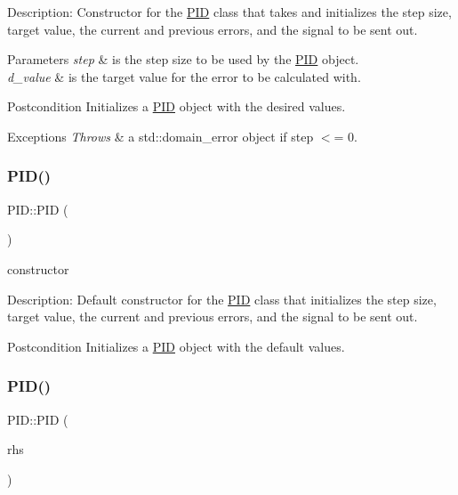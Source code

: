Description\+: Constructor for the \hyperlink{classPID}{P\+ID} class that takes and initializes the step size, target value, the current and previous errors, and the signal to be sent out. 
\begin{DoxyParams}{Parameters}
{\em step} & is the step size to be used by the \hyperlink{classPID}{P\+ID} object. \\
\hline
{\em d\+\_\+value} & is the target value for the error to be calculated with. \\
\hline
\end{DoxyParams}
\begin{DoxyPostcond}{Postcondition}
Initializes a \hyperlink{classPID}{P\+ID} object with the desired values. 
\end{DoxyPostcond}

\begin{DoxyExceptions}{Exceptions}
{\em Throws} & a std\+::domain\+\_\+error object if step $<$= 0. \\
\hline
\end{DoxyExceptions}
\mbox{\label{classPID_a0311b6f7de348499ce24e53ba353514a}} 
\subsubsection{\texorpdfstring{P\+I\+D()}{PID()}\hspace{0.1cm}{\footnotesize\ttfamily [2/3]}}
{\footnotesize\ttfamily P\+I\+D\+::\+P\+ID (\begin{DoxyParamCaption}{ }\end{DoxyParamCaption})\hspace{0.3cm}{\ttfamily [inline]}}



constructor 

Description\+: Default constructor for the \hyperlink{classPID}{P\+ID} class that initializes the step size, target value, the current and previous errors, and the signal to be sent out. \begin{DoxyPostcond}{Postcondition}
Initializes a \hyperlink{classPID}{P\+ID} object with the default values. 
\end{DoxyPostcond}
\mbox{\label{classPID_a41a7366e29da45f548e541952d13e553}} 
\subsubsection{\texorpdfstring{P\+I\+D()}{PID()}\hspace{0.1cm}{\footnotesize\ttfamily [3/3]}}
{\footnotesize\ttfamily P\+I\+D\+::\+P\+ID (\begin{DoxyParamCaption}\item[{const \hyperlink{classPID}{P\+ID} \&}]{rhs }\end{DoxyParamCaption})}



